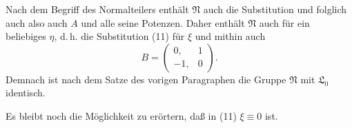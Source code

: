 Nach dem Begriff des Normalteilers enthält $\mathfrak{N}$ auch die Substitution
und folglich auch
also auch $A$ und alle seine Potenzen. Daher enthält $\mathfrak{N}$ auch
für ein beliebiges $\eta$, d.\,h. die Substitution (11) für  $\xi$ und mithin auch
\[
B = \begin{pmatrix} 0, & 1 \\ -1, & 0 \end{pmatrix}.
\]
Demnach ist nach dem Satze des vorigen Paragraphen die Gruppe $\mathfrak{N}$ mit $\mathfrak{L}_0$ identisch.

Es bleibt noch die Möglichkeit zu erörtern, daß in (11) $\xi \equiv 0$ ist.


